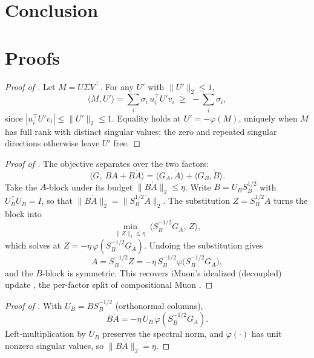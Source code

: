 \documentclass[11pt]{article}
\newcommand{\polar}{\varphi}                 %
\theoremstyle{plain}
\theoremstyle{definition}
\theoremstyle{remark}
\begin{document}
\section{Conclusion}
\label{sec:conclusion}

\appendix
\section{Proofs}
\label{app:proofs}

\begin{proof}[Proof of ]
Let $M=U\Sigma V^\top$. For any $U'$ with $\|U'\|_2\le1$,
\[
  \langle M,U'\rangle=\sum_i\sigma_i\,u_i^\top U' v_i \;\ge\; -\sum_i\sigma_i,
\]
since $|u_i^\top U' v_i|\le\|U'\|_2\le1$. Equality holds at $U'=-\polar(M)$, uniquely when $M$ has full rank with distinct singular values; the zero and repeated singular directions otherwise leave $U'$ free.
\end{proof}

\begin{proof}[Proof of ]
The objective separates over the two factors:
\[
  \langle G,\ \dot B A+B\dot A\rangle=\langle G_A,\dot A\rangle+\langle G_B,\dot B\rangle .
\]
Take the $A$-block under its budget $\|B\dot A\|_2\le\eta$. Write $B=U_B S_B^{1/2}$ with $U_B^\top U_B=I$, so that $\|B\dot A\|_2=\|S_B^{1/2}\dot A\|_2$. The substitution $Z=S_B^{1/2}\dot A$ turns the block into
\[
  \min_{\|Z\|_2\le\eta}\ \langle S_B^{-1/2}G_A,\,Z\rangle,
\]
which  solves at $Z=-\eta\,\polar(S_B^{-1/2}G_A)$. Undoing the substitution gives
\[
  \dot A=S_B^{-1/2}Z=-\eta\,S_B^{-1/2}\polar\!\big(S_B^{-1/2}G_A\big),
\]
and the $B$-block is symmetric. This recovers iMuon's idealized (decoupled) update \cite{imuon}, the per-factor split of compositional Muon \cite{tilde_csd}.
\end{proof}

\begin{proof}[Proof of ]
With $U_B=BS_B^{-1/2}$ (orthonormal columns),
\[
  B\dot A=-\eta\,U_B\,\polar(S_B^{-1/2}G_A).
\]
Left-multiplication by $U_B$ preserves the spectral norm, and $\polar(\cdot)$ has unit nonzero singular values, so $\|B\dot A\|_2=\eta$.
\end{proof}
\end{document}
